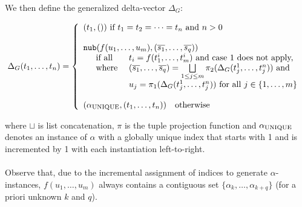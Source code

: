 \documentclass[a4paper, 11pt]{report}
\newcommand{\mt}[1]{\textnormal{#1}}
\begin{document}
\noindent
We then define the generalized delta-vector $\Delta_G$:

$$
  \Delta_G(t_1,\dots,t_n) = \left\{
    \begin{array}{l}

    (t_1,()) \mt{ if } t_1 = t_2 = \dots = t_n \mt{ and } n > 0\\
    \\

    \texttt{nub}(f(u_1,\dots,u_m), (\overline{s_1},\dots,\overline{s_q})) %
    \\
    \quad
    \begin{array}{l l}
      \mt{if all } & t_i = f(t_1^i,\dots,t_m^i) \mt{ and case 1 does not apply,}\\
      \mt{where } & (\overline{s_1},\dots,\overline{s_q}) = \bigsqcup\limits_{1 \leq j \leq m} \pi_2(\Delta_G(t_j^1,\dots,t_j^n)) \mt{ and}\\
                  & u_j = \pi_1(\Delta_G(t_j^1,\dots,t_j^n)) \mt{ for all } j \in \{1,\dots,m \}\\
    \end{array}
    
    \\
    \\
    
    (\alpha_{\mt{UNIQUE}},(t_1,\dots,t_n))\quad \mt{otherwise}\\
    \end{array}
  \right.
$$

\noindent
where $\sqcup$ is list concatenation, $\pi$ is the tuple projection function and $\alpha_{\mt{UNIQUE}}$ denotes an instance of $\alpha$ with a globally unique index that starts with 1 and is incremented by 1 with each instantiation left-to-right.\\
\\


Observe that, due to the incremental assignment of indices to generate $\alpha$-instances, $f(u_1,\dots,u_m)$ always contains a contiguous set $\{\alpha_k,\dots,\alpha_{k+q}\}$ (for a priori unknown $k$ and $q$).\\
\end{document}
